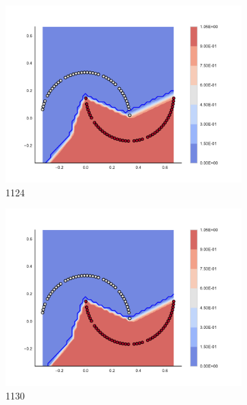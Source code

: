 \begin{figure}[h]
\begin{subfigure}[b]{0.09\textwidth}
    \includegraphics[clip, trim=2.35cm 1.75cm 4.5cm 0cm,width=\textwidth]{img/convergence/1124.pdf}
    \caption{1124}
    \label{fig:convergence_1124}
\end{subfigure}
%
\begin{subfigure}[b]{0.09\textwidth}
    \includegraphics[clip, trim=2.35cm 1.75cm 4.5cm 0cm,width=\textwidth]{img/convergence/1130.pdf}
    \caption{1130}
    \label{fig:convergence_1130}
\end{subfigure}
%
\begin{subfigure}[b]{0.09\textwidth}

\end{subfigure}
\end{figure}
